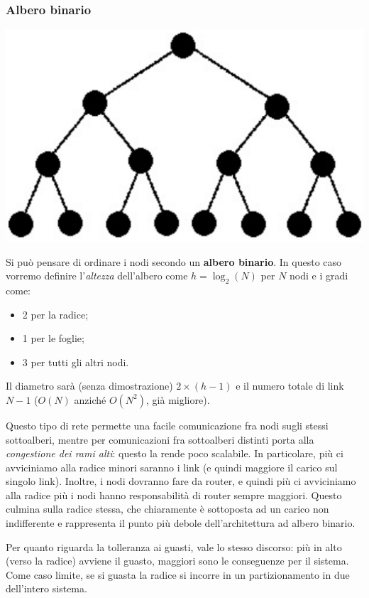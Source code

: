 \documentclass[a4paper,11pt]{article}
\begin{document}
\subsubsection{Albero binario}
\begin{center}
	\includegraphics[scale=0.11]{../figures/btree.png}
\end{center}
Si può pensare di ordinare i nodi secondo un \textbf{albero binario}.
In questo caso vorremo definire l'\textit{altezza} dell'albero come $h = \log_2(N)$ per $N$ nodi e i gradi come:
\begin{itemize}
	\item 2 per la radice;
	\item 1 per le foglie;
	\item 3 per tutti gli altri nodi.
\end{itemize}
Il diametro sarà (senza dimostrazione) $2 \times (h - 1)$ e il numero totale di link $N - 1$ ($O(N)$ anziché $O(N^2)$, già migliore).

Questo tipo di rete permette una facile comunicazione fra nodi sugli stessi sottoalberi, mentre per comunicazioni fra sottoalberi distinti porta alla \textit{congestione dei rami alti}: questo la rende poco scalabile.
In particolare, più ci avviciniamo alla radice minori saranno i link (e quindi maggiore il carico sul singolo link). Inoltre, i nodi dovranno fare da router, e quindi più ci avviciniamo alla radice più i nodi hanno responsabilità di router sempre maggiori.
Questo culmina sulla radice stessa, che chiaramente è sottoposta ad un carico non indifferente e rappresenta il punto più debole dell'architettura ad albero binario.

Per quanto riguarda la tolleranza ai guasti, vale lo stesso discorso: più in alto (verso la radice) avviene il guasto, maggiori sono le conseguenze per il sistema. Come caso limite, se si guasta la radice si incorre in un partizionamento in due dell'intero sistema.
\end{document}
